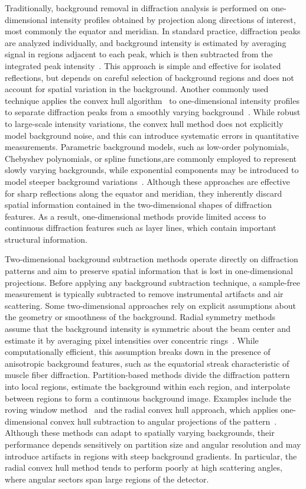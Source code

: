 \documentclass[iucr]{iucrjournals}
\begin{document}
Traditionally, background removal in diffraction analysis is performed on one-dimensional intensity profiles obtained by projection along directions of interest, most commonly the equator and meridian. In standard practice, diffraction peaks are analyzed individually, and background intensity is estimated by averaging signal in regions adjacent to each peak, which is then subtracted from the integrated peak intensity~\cite{NederKorsunskiy2018}. This approach is simple and effective for isolated reflections, but depends on careful selection of background regions and does not account for spatial variation in the background. Another commonly used technique applies the convex hull algorithm~\cite{jarvis1973convex_hull} to one-dimensional intensity profiles to separate diffraction peaks from a smoothly varying background~\cite{lee2019musclex}. While robust to large-scale intensity variations, the convex hull method does not explicitly model background noise, and this can introduce systematic errors in quantitative measurements. Parametric background models, such as low-order polynomials, Chebyshev polynomials, or spline functions,are commonly employed to represent slowly varying backgrounds, while exponential components may be introduced to model steeper background variations~\cite{rajkumar2007fibrefix}. Although these approaches are effective for sharp reflections along the equator and meridian, they inherently discard spatial information contained in the two-dimensional shapes of diffraction features. As a result, one-dimensional methods provide limited access to continuous diffraction features such as layer lines, which contain important structural information.

Two-dimensional background subtraction methods operate directly on diffraction patterns and aim to preserve spatial information that is lost in one-dimensional projections. Before applying any background subtraction technique, a sample-free measurement is typically subtracted to remove instrumental artifacts and air scattering. Some two-dimensional approaches rely on explicit assumptions about the geometry or smoothness of the background. Radial symmetry methods assume that the background intensity is symmetric about the beam center and estimate it by averaging pixel intensities over concentric rings~\cite{rajkumar2007fibrefix}. While computationally efficient, this assumption breaks down in the presence of anisotropic background features, such as the equatorial streak characteristic of muscle fiber diffraction. Partition-based methods divide the diffraction pattern into local regions, estimate the background within each region, and interpolate between regions to form a continuous background image. Examples include the roving window method~\cite{HeEtAl2007} and the radial convex hull approach, which applies one-dimensional convex hull subtraction to angular projections of the pattern~\cite{lee2019musclex}. Although these methods can adapt to spatially varying backgrounds, their performance depends sensitively on partition size and angular resolution and may introduce artifacts in regions with steep background gradients. In particular, the radial convex hull method tends to perform poorly at high scattering angles, where angular sectors span large regions of the detector.
\end{document}
